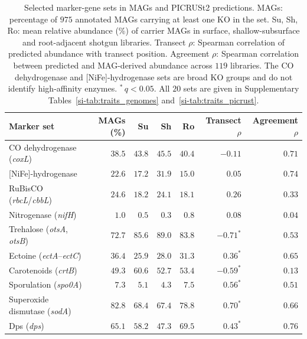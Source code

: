 \documentclass[fleqn,10pt,numbers]{olplainarticle}
\let\LaTeXbegin\begin \let\LaTeXend\end
\let\begin\LaTeXbegin \let\end\LaTeXend
\begin{document}
\begin{table}[htbp]
\centering\footnotesize
\caption{Selected marker-gene sets in MAGs and PICRUSt2 predictions. MAGs:
percentage of $975$ annotated MAGs carrying at least one KO in the set. Su,
Sh, Ro: mean relative abundance (\%) of carrier MAGs in surface,
shallow-subsurface and root-adjacent shotgun libraries. Transect $\rho$:
Spearman correlation of predicted abundance with transect position.
Agreement $\rho$: Spearman correlation between predicted and MAG-derived
abundance across $119$ libraries. The CO dehydrogenase and [NiFe]-hydrogenase
sets are broad KO groups and do not identify high-affinity enzymes. $^{*}$\,$q<0.05$. All $20$ sets are given in
Supplementary Tables~\ref{si-tab:traits_genomes} and~\ref{si-tab:traits_picrust}.}
\label{tab:markers}
\begin{tabular}{lrrrrrr}
\toprule
Marker set & MAGs (\%) & Su & Sh & Ro & Transect $\rho$ & Agreement $\rho$ \\
\midrule
CO dehydrogenase (\textit{coxL})              & $38.5$ & $43.8$ & $45.5$ & $40.4$ & $-0.11$       & $0.71$ \\
{[NiFe]}-hydrogenase                          & $22.6$ & $17.2$ & $31.9$ & $15.0$ & $0.05$        & $0.74$ \\
RuBisCO (\textit{rbcL}/\textit{cbbL})         & $24.6$ & $18.2$ & $24.1$ & $18.1$ & $0.26$        & $0.33$ \\
Nitrogenase (\textit{nifH})                   & $1.0$  & $0.5$  & $0.3$  & $0.8$  & $0.08$        & $0.04$ \\
Trehalose (\textit{otsA}, \textit{otsB})      & $72.7$ & $85.6$ & $89.0$ & $83.8$ & $-0.71^{*}$   & $0.53$ \\
Ectoine (\textit{ectA}--\textit{ectC})        & $36.4$ & $25.9$ & $28.0$ & $31.3$ & $0.36^{*}$    & $0.65$ \\
Carotenoids (\textit{crtB})                   & $49.3$ & $60.6$ & $52.7$ & $53.4$ & $-0.59^{*}$   & $0.13$ \\
Sporulation (\textit{spo0A})                  & $7.3$  & $5.1$  & $4.3$  & $7.5$  & $0.56^{*}$    & $0.51$ \\
Superoxide dismutase (\textit{sodA})          & $82.8$ & $68.4$ & $67.4$ & $78.8$ & $0.70^{*}$    & $0.66$ \\
Dps (\textit{dps})                            & $65.1$ & $58.2$ & $47.3$ & $69.5$ & $0.43^{*}$    & $0.76$ \\
\bottomrule
\end{tabular}
\end{table}
\end{document}
